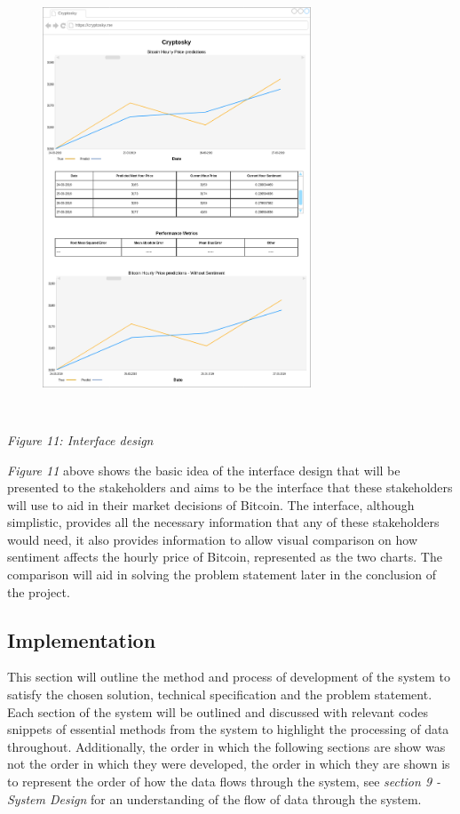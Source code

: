 \documentclass[oneside, 12pt]{article}
\begin{document}
		\begin{figure}[hbt!]
			\centering
			\includegraphics[width=8cm,height=13cm]{images/interface_design.png}
		\end{figure}
		\begin{center}
			\textit{Figure 11: Interface design}
		\end{center}
		\textit{Figure 11} above shows the basic idea of the interface design that will be presented to the stakeholders and aims to be the interface that these stakeholders will use to aid in their market decisions of Bitcoin. The interface, although simplistic, provides all the necessary information that any of these stakeholders would need, it also provides information to allow visual comparison on how sentiment affects the hourly price of Bitcoin, represented as the two charts. The comparison will aid in solving the problem statement later in the conclusion of the project.
		
	\newpage 
	\begin{center}
		\section{Implementation}\label{implementation}
	\end{center}
		This section will outline the method and process of development of the system to satisfy the chosen solution, technical specification and the problem statement. Each section of the system will be outlined and discussed with relevant codes snippets of essential methods from the system to highlight the processing of data throughout. Additionally, the order in which the following sections are show was not the order in which they were developed, the order in which they are shown is to represent the order of how the data flows through the system, see \textit{section 9 - System Design} for an understanding of the flow of data through the system.
		\newline
		
\end{document}

